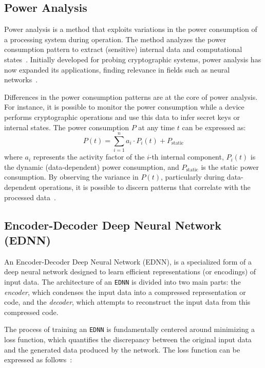 \documentclass[letterpaper]{article}
\begin{document}
\subsection{Power Analysis}
\label{sec:PowerAnalBackground}
Power analysis is a method that exploits variations in the power consumption of a processing system during operation. The method analyzes the power consumption pattern to extract (sensitive) internal data and computational states~\cite{10.1007/3-540-48405-1_25}. Initially developed for probing cryptographic systems, power analysis has now expanded its applications, finding relevance in fields such as neural networks~\cite{Real2021PhysicalSA}.

Differences in the power consumption patterns are at the core of power analysis. For instance, it is possible to monitor the power consumption while a device performs cryptographic operations and use this data to infer secret keys or internal states. The power consumption $ P $ at any time $ t $ can be expressed as:
\begin{equation}
P(t) = \sum_{i=1}^{n} a_i \cdot P_i(t) + P_{\text{static}}
\end{equation}
where $ a_i $ represents the activity factor of the $ i $-th internal component, $ P_i(t) $ is the dynamic (data-dependent) power consumption, and $ P_{\text{static}} $ is the static power consumption. By observing the variance in $ P(t) $, particularly during data-dependent operations, it is possible to discern patterns that correlate with the processed data~\cite{10.1007/3-540-48405-1_25}.


\subsection{Encoder-Decoder Deep Neural Network (EDNN)}
\label{sec:AutoEncBackground}
An Encoder-Decoder Deep Neural Network (EDNN), is a specialized form of a deep neural network designed to learn efficient representations (or encodings) of input data. The architecture of an \texttt{EDNN} is divided into two main parts: the \emph{encoder}, which condenses the input data into a compressed representation or code, and the \emph{decoder}, which attempts to reconstruct the input data from this compressed code.

The process of training an \texttt{EDNN} is fundamentally centered around minimizing a loss function, which quantifies the discrepancy between the original input data and the generated data produced by the network. The loss function can be expressed as follows~\cite{nielsen2015neural}:
\end{document}
